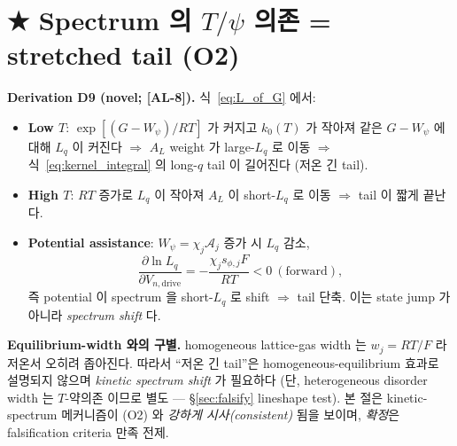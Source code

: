 \documentclass[11pt,a4paper]{article}
\newcommand{\dimedrive}{\mathrm{drive}}
\newcommand{\AL}[1]{\textsf{[AL-#1]}}
\begin{document}
\section{★ Spectrum 의 $T/\psi$ 의존 = stretched tail (O2)}\label{sec:tailT}
\textbf{Derivation D9 (novel; \AL{8}).} 식~\eqref{eq:L_of_G} 에서:
\begin{itemize}
\item \textbf{Low $T$}: $\exp[(G-W_\psi)/RT]$ 가 커지고 $k_0(T)$ 가 작아져 같은 $G-W_\psi$
  에 대해 $L_q$ 이 커진다 $\Rightarrow$ $A_L$ weight 가 large-$L_q$ 로 이동 $\Rightarrow$
  식~\eqref{eq:kernel_integral} 의 long-$q$ tail 이 길어진다 (저온 긴 tail).
\item \textbf{High $T$}: $RT$ 증가로 $L_q$ 이 작아져 $A_L$ 이 short-$L_q$ 로 이동 $\Rightarrow$
  tail 이 짧게 끝난다.
\item \textbf{Potential assistance}: $W_\psi=\chi_j\mathcal A_j$ 증가 시 $L_q$ 감소,
  \begin{equation}
  \frac{\partial\ln L_q}{\partial V_{n,\dimedrive}}=-\frac{\chi_j s_{\phi,j}F}{RT}<0\ (\text{forward}),
  \label{eq:psi_shift}
  \end{equation}
  즉 potential 이 spectrum 을 short-$L_q$ 로 shift $\Rightarrow$ tail 단축. 이는 state jump
  가 아니라 \emph{spectrum shift} 다.
\end{itemize}
\textbf{Equilibrium-width 와의 구별.} homogeneous lattice-gas width 는 $w_j=RT/F$ 라 저온서
오히려 좁아진다. 따라서 ``저온 긴 tail''은 homogeneous-equilibrium 효과로 설명되지 않으며
\emph{kinetic spectrum shift} 가 필요하다 (단, heterogeneous disorder width 는 $T$-약의존
이므로 별도 — \S\ref{sec:falsify} lineshape test). 본 절은 kinetic-spectrum 메커니즘이
(O2) 와 \emph{강하게 시사(consistent)} 됨을 보이며, \emph{확정}은 falsification criteria 만족 전제.

\end{document}
